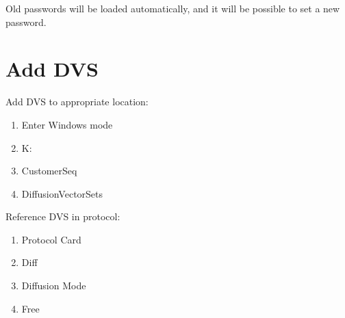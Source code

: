 \documentclass[11pt]{article}
\begin{document}
Old passwords will be loaded automatically, and it will be possible to set a new password.

\section{Add DVS}

Add DVS to appropriate location:

\begin{enumerate}
    \item Enter Windows mode
    \item K:
    \item CustomerSeq
    \item DiffusionVectorSets
\end{enumerate}

Reference DVS in protocol:

\begin{enumerate}
    \item Protocol Card
    \item Diff
    \item Diffusion Mode
    \item Free
\end{enumerate}
\end{document}

